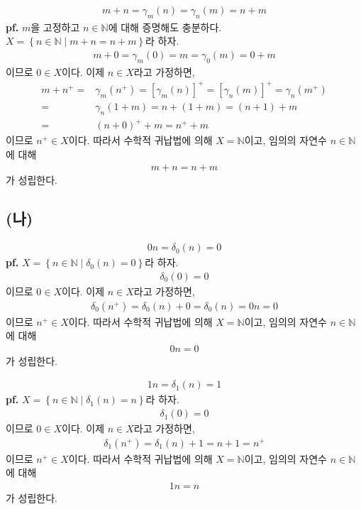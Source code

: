 \documentclass{article}
\begin{document}
\begin{align*}
m+n = \gamma_m(n) = \gamma_n(m) = n+m
\end{align*}
\textbf{pf.} $m$을 고정하고 $n \in \mathbb{N}$에 대해 증명해도 충분하다. 
\\$X = \left\{n \in \mathbb{N} \mid m+n=n+m \right\}$라 하자.
\begin{align*}
m+0 = \gamma_m(0) = m = \gamma_0(m) = 0+m
\end{align*}이므로 $0 \in X$이다. 이제 $n \in X$라고 가정하면,
\begin{align*}
m+n^+ =& \gamma_m(n^+) = [\gamma_m(n)]^+ = [\gamma_n(m)]^+ = \gamma_n(m^+)
\\ =& \gamma_n(1+m) = n + (1+m) = (n+1)+m 
\\ =& (n+0)^+ + m= n^+ + m
\end{align*}이므로 $n^+ \in X$이다. 따라서 수학적 귀납법에 의해 $X = \mathbb{N}$이고, 임의의 자연수 $n \in \mathbb{N}$에 대해
\begin{align*}
m+n = n+m
\end{align*}가 성립한다. 

\subsection{(나)}
\begin{align*}
0n = \delta_0(n) = 0
\end{align*}
\textbf{pf.} $X = \left\{ n \in \mathbb{N} \mid \delta_0(n) = 0 \right\}$라 하자.
\begin{align*}
\delta_0(0) = 0
\end{align*}이므로 $0 \in X$이다. 이제 $n \in X$라고 가정하면,
\begin{align*}
\delta_0(n^+) = \delta_0(n)+0 = \delta_0(n) = 0n = 0
\end{align*}이므로 $n^+ \in X$이다. 따라서 수학적 귀납법에 의해 $X = \mathbb{N}$이고, 임의의 자연수 $n \in \mathbb{N}$에 대해
\begin{align*}
0n = 0
\end{align*}가 성립한다.

\begin{align*}
1n = \delta_1(n) = 1
\end{align*}
\textbf{pf.} $X = \left\{ n \in \mathbb{N} \mid \delta_1(n) = n \right\}$라 하자.
\begin{align*}
\delta_1(0) = 0
\end{align*}이므로 $0 \in X$이다. 이제 $n \in X$라고 가정하면,
\begin{align*}
\delta_1(n^+) = \delta_1(n)+1 = n+1 = n^+
\end{align*}이므로 $n^+ \in X$이다. 따라서 수학적 귀납법에 의해 $X = \mathbb{N}$이고, 임의의 자연수 $n \in \mathbb{N}$에 대해
\begin{align*}
1n = n
\end{align*}가 성립한다.
\end{document}
